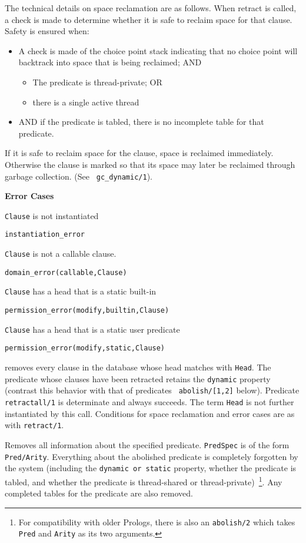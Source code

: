\begin{description}
The technical details on space reclamation are as follows.  When
retract is called, a check is made to determine whether it is safe to
reclaim space for that clause.  Safety is ensured when:
\begin{itemize}
\item A check is made of the choice point stack indicating that no
  choice point will backtrack into space that is being reclaimed; AND
\begin{itemize}
\item The predicate is thread-private; OR 
\item there is a single active thread
\end{itemize}
\item AND if the predicate is tabled, there is no incomplete table
     for that predicate.
\end{itemize}
If it is safe to reclaim space for the clause, space is reclaimed
immediately.  Otherwise the clause is marked so that its space may
later be reclaimed through garbage collection.  (See {\tt
  gc\_dynamic/1}).

{\bf Error Cases}
\bi
\item 	{\tt Clause} is not instantiated
\bi
\item 	{\tt instantiation\_error}
\ei
%
\item 	{\tt Clause} is not a callable clause.
\bi
\item 	{\tt domain\_error(callable,Clause)}
\ei
%
\item 	{\tt Clause} has a head that is a static built-in
\bi
\item 	{\tt permission\_error(modify,builtin,Clause)}
\ei
\item 	{\tt Clause} has a head that is a static user predicate
\bi
\item 	{\tt permission\_error(modify,static,Clause)}
\ei
%
\ei

 removes every
clause in the database whose head matches with {\tt Head}.  The
predicate whose clauses have been retracted retains the {\tt dynamic}
property (contrast this behavior with that of predicates {\tt
  abolish/[1,2]} below).  Predicate {\tt retractall/1} is determinate
and always succeeds.  The term {\tt Head} is not further instantiated
by this call.  Conditions for space reclamation and error cases are as
with {\tt retract/1}.

 Removes all
information about the specified predicate. {\tt PredSpec} is of the
form {\tt Pred/Arity}.  Everything about the abolished predicate is
completely forgotten by the system (including the {\tt dynamic or
  static} property, whether the predicate is tabled, and whether the
predicate is thread-shared or thread-private)~\footnote{For
  compatibility with older Prologs, there is also an {\tt abolish/2}
  which takes {\tt Pred} and {\tt Arity} as its two arguments.}.  Any
completed tables for the predicate are also removed.


\end{description}
